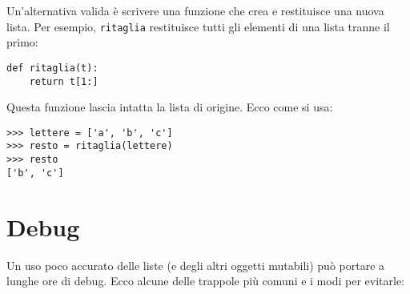 \documentclass[10pt]{book}
\begin{document}
Un'alternativa valida è scrivere una funzione che crea e restituisce una nuova lista. Per esempio, {\tt ritaglia} restituisce tutti gli elementi di una lista tranne il primo:

\begin{verbatim}
def ritaglia(t):
    return t[1:]
\end{verbatim}
%
Questa funzione lascia intatta la lista di origine. Ecco come si usa:

\begin{verbatim}
>>> lettere = ['a', 'b', 'c']
>>> resto = ritaglia(lettere)
>>> resto
['b', 'c']
\end{verbatim}



\section{Debug}

Un uso poco accurato delle liste (e degli altri oggetti mutabili) può portare a lunghe ore di debug. Ecco alcune delle trappole più comuni e i modi per evitarle:
\end{document}
